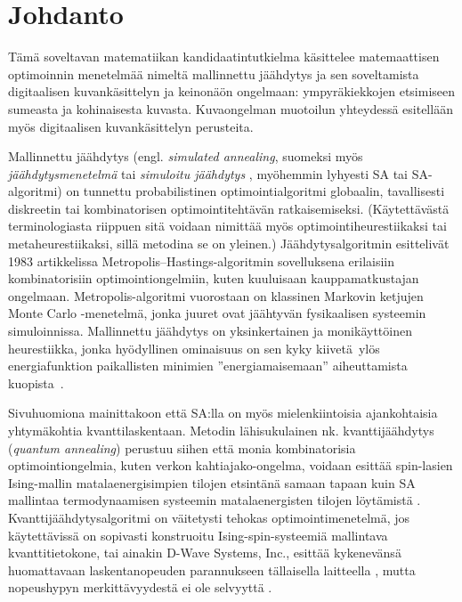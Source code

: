 \chapter{Johdanto}
\label{cha:johdanto}


Tämä soveltavan matematiikan kandidaatintutkielma käsittelee matemaattisen optimoinnin menetelmää nimeltä mallinnettu jäähdytys ja sen soveltamista digitaalisen kuvankäsittelyn ja keinonäön ongelmaan: ympyräkiekkojen etsimiseen sumeasta ja kohinaisesta kuvasta.
Kuvaongelman muotoilun yhteydessä esitellään myös digitaalisen kuvankäsittelyn perusteita.

Mallinnettu jäähdytys (engl. \emph{simulated annealing}, suomeksi myös \emph{jäähdytysmenetelmä} tai \emph{simuloitu jäähdytys} \cite[suomennokset ks.][]{haataja93}, myöhemmin lyhyesti SA tai SA-algoritmi) on tunnettu probabilistinen optimointialgoritmi globaalin, tavallisesti diskreetin tai kombinatorisen optimointitehtävän ratkaisemiseksi.
(Käytettävästä terminologiasta riippuen sitä voidaan nimittää myös optimointiheurestiikaksi tai metaheurestiikaksi, sillä metodina se on yleinen.)
Jäähdytysalgoritmin esittelivät \citeauthor*{kirkpatrick83} 1983 artikkelissa \cite{kirkpatrick83} Metropolis--Hastings-algoritmin sovelluksena erilaisiin kombinatorisiin optimointiongelmiin, kuten kuuluisaan kauppamatkustajan ongelmaan.
Metropolis-algoritmi vuorostaan on klassinen Markovin ketjujen Monte Carlo -menetelmä, jonka juuret ovat jäähtyvän fysikaalisen systeemin simuloinnissa.
Mallinnettu jäähdytys on yksinkertainen ja monikäyttöinen heurestiikka,
jonka hyödyllinen ominaisuus on sen kyky kiivetä ylös energiafunktion paikallisten minimien ''energiamaisemaan'' aiheuttamista kuopista~\cite{salamonetal}.

Sivuhuomiona mainittakoon että SA:lla on myös mielenkiintoisia ajankohtaisia yhtymäkohtia kvanttilaskentaan.
Metodin lähisukulainen nk. kvanttijäähdytys (\emph{quantum annealing}) perustuu siihen että monia kombinatorisia optimointiongelmia,
kuten verkon kahtiajako-ongelma, voidaan esittää spin-lasien Ising-mallin matalaenergisimpien tilojen etsintänä samaan tapaan kuin SA mallintaa termodynaamisen systeemin matalaenergisten tilojen löytämistä \cites[luku 4.5]{laarhoven}[]{johnson11dwave}.
Kvanttijäähdytysalgoritmi on väitetysti tehokas optimointimenetelmä, jos käytettävissä on sopivasti konstruoitu Ising-spin-systeemiä mallintava kvanttitietokone,
tai ainakin D-Wave Systems, Inc., esittää kykenevänsä huomattavaan laskentanopeuden parannukseen tällaisella laitteella \cite{johnson11dwave, denchev2015},
mutta nopeushypyn merkittävyydestä ei ole selvyyttä \cite{troyer2015}.

